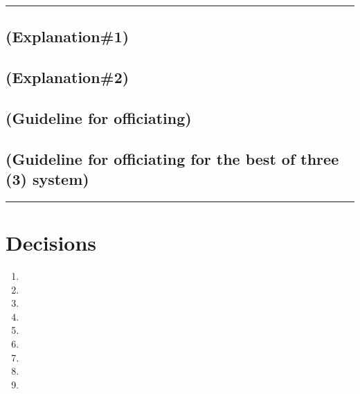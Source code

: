 \documentclass[draft]{report}
\newenvironment{expl}[0]%
  {\rule{\textwidth}{.2pt}\footnotesize}%
  {\rule{\textwidth}{.2pt}\normalsize}
\begin{document}
\begin{expl}

\section{(Explanation\#1)}

\section{(Explanation\#2)}

\section{(Guideline for officiating)}

\section{(Guideline for officiating for the best of three (3) system)}

\end{expl}


\chapter{Decisions}\label{decisions}

\begin{enumerate}
\item

\item

\item

\item

\item

\item

\item

\item

\item

\end{enumerate}
\end{document}
